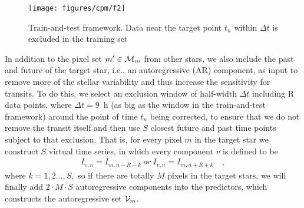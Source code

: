 \begin{figure}[p]
\begin{center}
\texttt{[image: figures/cpm/f2]}
\end{center}
\caption{
  \label{train-and-test} 
  Train-and-test framework. 
  Data near the target point $t_{n}$ within $\Delta t$ is excluded in the training set}
\end{figure}
  
In addition to the pixel set $m'\in\mathcal{M}_m$ from other stars,  
  we also include the past and future of the target star, i.e., an autoregressive (AR) component, as input 
  to remove more of the stellar variability and thus increase the sensitivity for transits. 
To do this, we select an exclusion window of half-width $\Delta t$ including R data points, 
  where $\Delta t=9$\, h (as big as the window in the train-and-test framework) 
  around the point of time $t_{n}$ being corrected, 
  to ensure that we do not remove the transit itself 
  and then use $S$ closest future and past time points subject to that exclusion. 
That is, for every pixel $m$ in the target star we construct $S$ virtual time series, 
  in which every component $v$ is defined to be     
\begin{eqnarray}
I_{v,n} = I_{m,n-R-k}\ or\ I_{v,n} = I_{m,n+R+k}
\quad,
\end{eqnarray}
where $k = 1, 2\dots, S,$ so if there are totally $M$ pixels in the target stars, 
  we will finally add $2\cdot M\cdot S$
  autoregressive components into the predictors, which constructs the autoregressive set $\mathcal{V}_m$.


